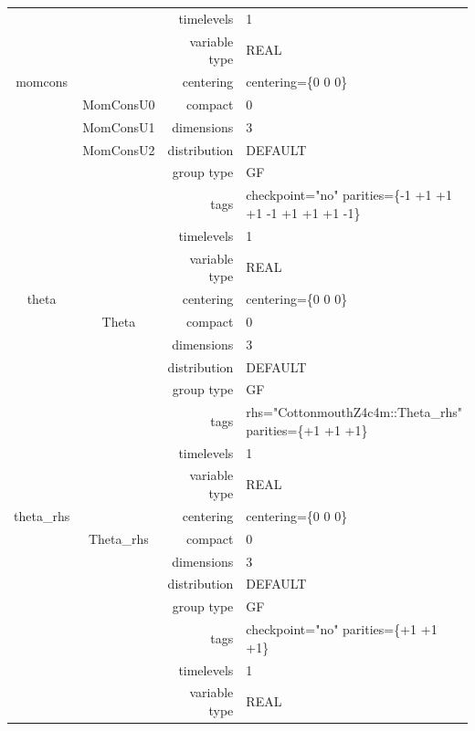 \documentclass{article}
\begin{document}
\begin{tabular*}{150mm}{|c|c@{\extracolsep{\fill}}|rl|}
 &  & timelevels & 1 \\ 
 &  & variable type & REAL \\ 
\hline 
momcons &  & centering & centering=\{0 0 0\} \\ 
 & MomConsU0 & compact & 0 \\ 
 & MomConsU1 & dimensions & 3 \\ 
 & MomConsU2 & distribution & DEFAULT \\ 
 &  & group type & GF \\ 
 &  & tags & checkpoint="no" parities=\{-1 +1 +1  +1 -1 +1  +1 +1 -1\} \\ 
 &  & timelevels & 1 \\ 
 &  & variable type & REAL \\ 
\hline 
theta &  & centering & centering=\{0 0 0\} \\ 
 & Theta & compact & 0 \\ 
 &  & dimensions & 3 \\ 
 &  & distribution & DEFAULT \\ 
 &  & group type & GF \\ 
 &  & tags & rhs="CottonmouthZ4c4m::Theta\_rhs" parities=\{+1 +1 +1\} \\ 
 &  & timelevels & 1 \\ 
 &  & variable type & REAL \\ 
\hline 
theta\_rhs &  & centering & centering=\{0 0 0\} \\ 
 & Theta\_rhs & compact & 0 \\ 
 &  & dimensions & 3 \\ 
 &  & distribution & DEFAULT \\ 
 &  & group type & GF \\ 
 &  & tags & checkpoint="no" parities=\{+1 +1 +1\} \\ 
 &  & timelevels & 1 \\ 
 &  & variable type & REAL \\ 
\hline 
\end{tabular*} 



\vspace{5mm}
\vspace{5mm}
\end{document}

